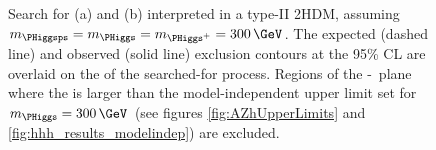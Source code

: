 \begin{figure}[h!]
\begin{center}
\caption[Search for \Htohhtobbtautau and search for \AtoZhtolltautau
interpreted in a type-II 2HDM, assuming $m_{\PHiggsps}=m_{\PHiggs}=m_{\PHiggs^+}=300\,\GeV$.]{Search for (a) \Htohhtobbtautau and (b) \AtoZhtolltautau interpreted in a type-II 
\ac{2HDM}, assuming $m_{\PHiggsps}=m_{\PHiggs}=m_{\PHiggs^+}=300\,\GeV$. 
The expected (dashed line)
and observed (solid line) exclusion contours at the 95\% \ac{CL} are overlaid
on the \xsbr of the searched-for process.
Regions of the \cosba-\tanb~plane where the 
\xsbr is larger than the model-independent upper limit set for $m_{\PHiggs} = 300\,\GeV$ 
(see figures \ref{fig:AZhUpperLimits} and \ref{fig:hhh_results_modelindep}) are excluded.}
\label{fig:HhhandAZh2HDMOverlaid}
\end{center}
\end{figure}


